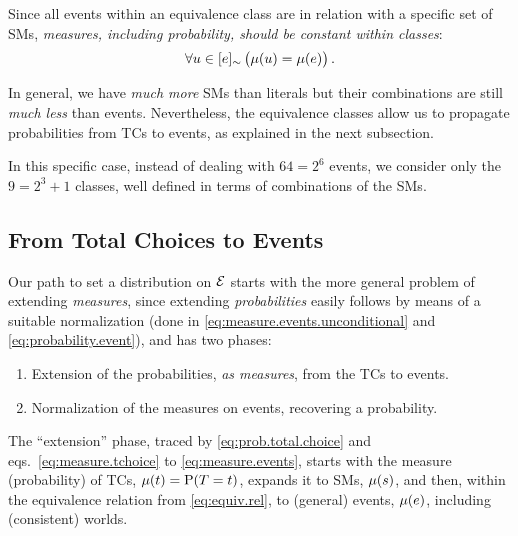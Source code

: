 \documentclass[adraft,copyright,creativecommons]{eptcs}
\newcommand{\at}[1]{\ensuremath{\!\del{#1}}}
\newcommand{\fml}[1]{\ensuremath{{\cal #1}}}
\newcommand{\pr}[1]{\ensuremath{\mathrm{P}\at{#1}}}
\newcommand{\pw}[1]{\ensuremath{\mu\at{#1}}}
\newcommand{\class}[1]{\ensuremath{[{#1}]_{\sim}}}
\begin{document}
 Since all events within an equivalence class are in relation with a specific set of \aclp{SM}, \emph{measures, including probability, should be constant within classes}:
          \[
              \forall u\in \class{e} \left(\mu\at{u} = \mu\at{e} \right).
          \]
          
     In general, we have \emph{much more} \aclp{SM} than literals but their combinations are still \emph{much less} than events. Nevertheless, the equivalence classes allow us to propagate probabilities from \aclp{TC} to events, as explained in the next subsection.
          
    In this specific case, instead of dealing with $64 = 2^6$ events, we consider only the $9 = 2^3 + 1$ classes, well defined in terms of combinations of the \aclp{SM}.

%
%
%
\subsection{From Total Choices to Events}\label{subsec:from.tchoices.to.events}
%
%
%
Our path to set a distribution on $\fml{E}$ starts with the more general problem of extending \emph{measures}, since extending \emph{probabilities} easily follows by means of a suitable normalization (done in \eqref{eq:measure.events.unconditional} and \eqref{eq:probability.event}), and has two phases:
\begin{enumerate}
    \item Extension of the probabilities, \emph{as measures}, from the \aclp{TC} to events.
    \item Normalization of the measures on events, recovering a probability.
\end{enumerate}

The ``extension'' phase, traced by \cref{eq:prob.total.choice} and eqs.\ \eqref{eq:measure.tchoice} to \eqref{eq:measure.events}, starts with the measure (probability) of \aclp{TC}, $\pw{t} = \pr{T = t}$, expands it to \aclp{SM}, $\pw{s}$, and then, within the equivalence relation from \cref{eq:equiv.rel}, to (general) events, $\pw{e}$, including (consistent) worlds.
\end{document}
